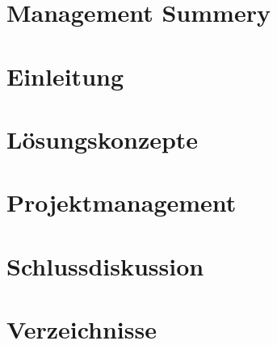 \documentclass[11pt]{scrartcl}
\begin{document}
        \section{Management Summery}
        
        \clearpage
        \section{Einleitung}
        
        \clearpage
        \section{Lösungskonzepte}
        
        \clearpage
        
        \clearpage
        
        \clearpage
        
        \clearpage
        
        \clearpage
        
        \clearpage
        
        \clearpage
        
        \clearpage
        
        \clearpage
        
        \clearpage
        
        \clearpage
        
        \clearpage
        \section{Projektmanagement}
        
        \clearpage
        \section{Schlussdiskussion}
        
        \clearpage
        \section{Verzeichnisse}
        \listoffigures
        \listoftables
        

    
\end{document}
